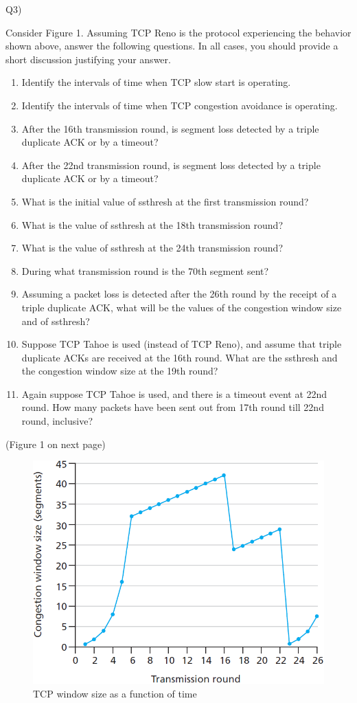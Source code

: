 \documentclass[10pt,letterpaper]{article}
\begin{document}
Q3)

Consider Figure 1. Assuming TCP Reno is the protocol experiencing the behavior shown above, answer the following questions. In all cases, you should provide a short discussion justifying your answer.
\begin{enumerate}[label=\alph*-]
\item
Identify the intervals of time when TCP slow start is operating.
\item
Identify the intervals of time when TCP congestion avoidance is
operating.
\item
After the 16th transmission round, is segment loss detected by a triple
duplicate ACK or by a timeout?
\item
After the 22nd transmission round, is segment loss detected by a triple
duplicate ACK or by a timeout?
\item
What is the initial value of ssthresh at the first transmission round?
\item
What is the value of ssthresh at the 18th transmission round?
\item
What is the value of ssthresh at the 24th transmission round?
\item
During what transmission round is the 70th segment sent?
\item
Assuming a packet loss is detected after the 26th round by the receipt of a
triple duplicate ACK, what will be the values of the congestion window
size and of ssthresh?
\item
Suppose TCP Tahoe is used (instead of TCP Reno), and assume that triple
duplicate ACKs are received at the 16th round. What are the ssthresh
and the congestion window size at the 19th round?
\item
Again suppose TCP Tahoe is used, and there is a timeout event at 22nd
round. How many packets have been sent out from 17th round till 22nd
round, inclusive?
\end{enumerate}

{\huge (Figure 1 on next page)}

\begin{figure}[htbp]
\centering
\includegraphics[width=150mm]{congestion.png}
\caption{TCP window size as a function of time}
\end{figure}
\end{document}
